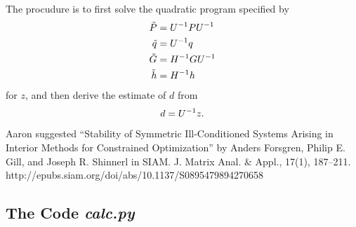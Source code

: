\documentclass[11pt]{article}
\begin{document}
The procudure is to first solve the quadratic program specified by
\begin{align*}
  \tilde P &= U^{-1} P U^{-1} \\
  \tilde q &= U^{-1} q \\
  \tilde G &= H^{-1}G U^{-1} \\
  \tilde h &= H^{-1}h
\end{align*}
for $z$, and then derive the estimate of $d$ from
\begin{equation*}
  d = U^{-1} z.
\end{equation*}



Aaron suggested ``Stability of Symmetric Ill-Conditioned Systems
Arising in Interior Methods for Constrained Optimization'' by Anders
Forsgren, Philip E. Gill, and Joseph R. Shinnerl in SIAM. J. Matrix
Anal. \& Appl., 17(1),
187–211. http://epubs.siam.org/doi/abs/10.1137/S0895479894270658

\subsection{The Code \emph{calc.py}}
\label{sec:code}
\end{document}

